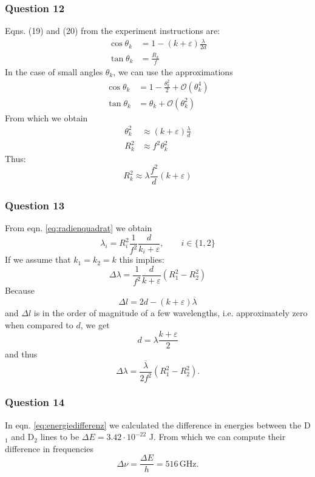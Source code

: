\subsubsection{Question 12}
Eqns. (19) and (20) from the experiment instructions are:
\begin{align}
	\cos \theta_k &=1-(k+\varepsilon)\frac{\lambda}{2d}\\
	\tan\theta_k &=\frac{R_k}{f}
\end{align}
In the case of small angles $\theta_k$, we can use the approximations
\begin{align}
	\cos\theta_k&=1-\frac{\theta_k^2}{2}+\mathcal O(\theta_k^4)\\
	\tan \theta_k &= \theta_k +\mathcal O (\theta_k^2)
\end{align}
From which we obtain
\begin{align}
	\theta_k^2&\approx (k+\varepsilon)\frac{\lambda}{d}\\
	R_k^2&\approx f^2 \theta_k^2
\end{align}
Thus:
\begin{equation}
	R_k^2\approx \lambda \frac{f^2}{d}(k+\varepsilon)\label{eq:radienquadrat}
\end{equation}
\subsubsection{Question 13}
From eqn. \eqref{eq:radienquadrat} we obtain
\begin{equation}
		\lambda_i=R^2_i \frac{1}{f^2}\frac{d}{k_i+\varepsilon}, \qquad i \in\{1,2\}
\end{equation}
If we assume that $k_1=k_2=k$ this implies:
\begin{equation}
	\Delta \lambda = \frac{1}{f^2} \frac{d}{k+\varepsilon} (R_1^2-R_2^2)
\end{equation}
Because 
\begin{equation}
	\Delta l = 2d-(k+\varepsilon)\overline\lambda
\end{equation}
and $\Delta l$ is in the order of magnitude of a few wavelengths, i.e. approximately zero when compared to $d$, we get
\begin{equation}
	d=\lambda\frac{k+\varepsilon}{2}
\end{equation}
and thus
\begin{equation}
	\Delta \lambda = \frac{\overline \lambda}{2f^2}(R_1^2-R_2^2).
\end{equation}
\subsubsection{Question 14}
In eqn. \eqref{eq:energiedifferenz} we calculated the difference in energies between the D$_1$ and D$_2$ lines to be $\Delta E=3.42\cdot 10^{-22}$ \si{\joule}. From which we can compute their difference in frequencies 
\begin{equation}
	\Delta \nu = \frac{\Delta E}{h}=516 \,\si{\giga\hertz}.
\end{equation}
